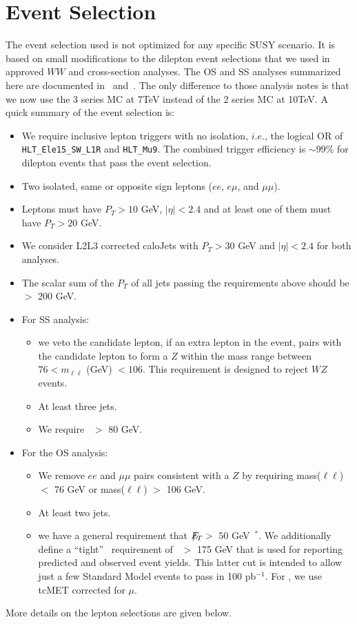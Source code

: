 \section{Event Selection}
\label{sec:eventselection}

The event selection used is not optimized for any specific SUSY
scenario. It is based on small modifications to the dilepton event
selections  that we used in approved $WW$\cite{ww} and
\ttbar\cite{ttbar} cross-section analyses.  The OS and SS analyses
summarized here are documented in~\cite{osnote} and~\cite{ssnote}. The
only difference to those analysis notes is that we now use the 3
series MC at 7TeV instead of the 2 series MC at 10TeV.  
A quick summary of the event selection is:

\begin{itemize}
\item We require inclusive lepton triggers with no isolation, $i.e.$, the
  logical OR of {\tt HLT\_Ele15\_SW\_L1R} and {\tt HLT\_Mu9}. 
  The combined trigger efficiency is $\sim 99$\% for dilepton events that pass the event selection.
\item Two isolated, same or opposite sign leptons ($ee$, $e\mu$, and $\mu\mu$). 
\item Leptons must have $P_T > 10$ GeV, $|\eta|< 2.4$ and at least one of them must have $P_T > 20$ GeV.
\item We consider L2L3 corrected caloJets with $P_T > 30$ GeV and
	$|\eta|< 2.4$ for both analyses. 
\item The scalar sum of the $P_T$ of all jets passing the requirements above should be $>$ 200 GeV.
\item For SS analysis:
\begin{itemize}
      \item  we veto the candidate lepton, if an extra lepton in the event, pairs with the candidate lepton
             to form a $Z$ within the mass range between $76 < m_{\ell\ell} $ (GeV) $< 106$. This requirement is 
             designed to reject $WZ$ events.
      \item At least three jets.
      \item We require \met~$>$ 80 GeV.
\end{itemize}
\item For the OS analysis: 
\begin{itemize}
      \item We remove $ee$ and $\mu\mu$ pairs consistent with a $Z$ by requiring mass($\ell\ell$) $<$ 76 GeV or mass($\ell\ell$) $>$ 106 GeV.
      \item At least two jets.
      \item we have a general requirement that $E\!\!\!\!/_T>$~50 GeV~$^*$. We additionally define a ``tight'' \met~requirement of \met~$>$ 175 GeV
	that is used for reporting predicted and observed event yields.
	This latter cut is intended to allow just a few Standard Model events to
	pass in 100 pb$^{-1}$.  For \met, we use tcMET \cite{tcmet}
	corrected for $\mu$.
\end{itemize}
\end{itemize}
\noindent More details on the lepton %
selections are given below.

